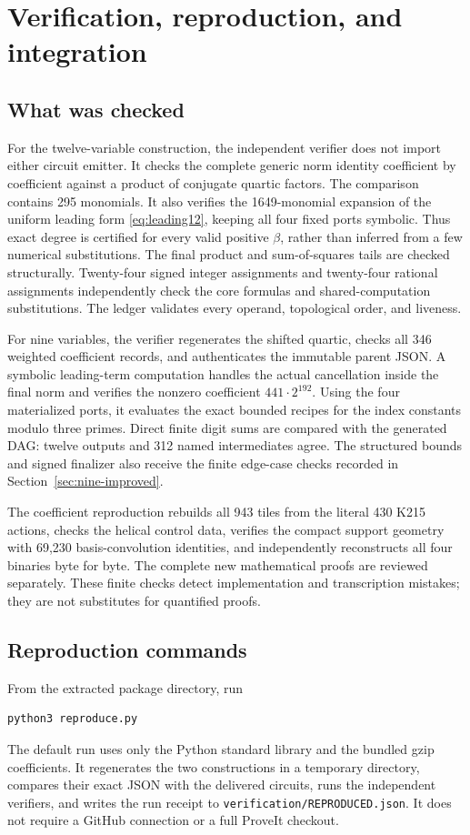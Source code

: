 \section{Verification, reproduction, and integration}

\subsection{What was checked}
For the twelve-variable construction, the independent verifier does not
import either circuit emitter. It checks the complete generic norm identity
coefficient by coefficient against a product of conjugate quartic factors.
The comparison contains 295 monomials. It also verifies the 1649-monomial
expansion of the uniform leading form \eqref{eq:leading12}, keeping all
four fixed ports symbolic. Thus exact degree is certified for every valid
positive $\beta$, rather than inferred from a few numerical substitutions.
The final product and sum-of-squares tails are checked structurally.
Twenty-four signed integer assignments and twenty-four rational assignments
independently check the core formulas and shared-computation substitutions.
The ledger validates every operand, topological order, and liveness.

For nine variables, the verifier regenerates the shifted quartic, checks all
346 weighted coefficient records, and authenticates the immutable parent
JSON. A symbolic leading-term computation handles the actual cancellation
inside the final norm and verifies the nonzero coefficient
$441\cdot2^{192}$. Using the four materialized ports, it evaluates the exact
bounded recipes for the index constants modulo three primes. Direct finite
digit sums are compared with the generated DAG: twelve outputs and 312
named intermediates agree. The structured bounds and signed finalizer also
receive the finite edge-case checks recorded in Section~\ref{sec:nine-improved}.

The coefficient reproduction rebuilds all 943 tiles from the literal 430
K215 actions, checks the helical control data, verifies the compact support
geometry with 69,230 basis-convolution identities, and independently
reconstructs all four binaries byte for byte. The complete new mathematical
proofs are reviewed separately. These finite checks detect implementation
and transcription mistakes; they are not substitutes for quantified proofs.

\subsection{Reproduction commands}
From the extracted package directory, run
\begin{verbatim}
python3 reproduce.py
\end{verbatim}
The default run uses only the Python standard library and the bundled gzip
coefficients. It regenerates the two constructions in a temporary directory,
compares their exact JSON with the delivered circuits, runs the independent
verifiers, and writes the run receipt to \texttt{verification/REPRODUCED.json}.
It does not require a GitHub connection or a full ProveIt checkout.

